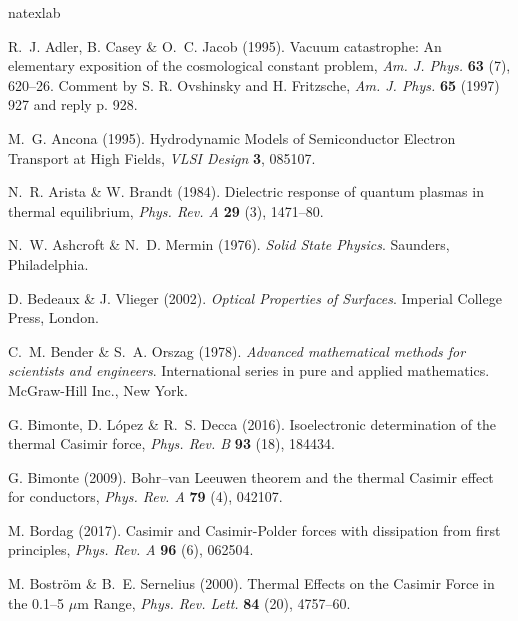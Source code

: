 \documentclass[11pt, oneside]{article}   	%
\begin{document}
\begin{thebibliography}{58}
\expandafter\ifx\csname natexlab\endcsname\relax\def\natexlab#1{#1}\fi

R.~J. Adler, B. Casey \& O.~C. Jacob (1995).
\newblock Vacuum catastrophe: An elementary exposition of the cosmological
  constant problem, \emph{Am. J. Phys.} {\bf 63} (7), 620--26.
\newblock Comment by S. R. Ovshinsky and H. Fritzsche, \emph{Am. J. Phys.} {\bf
  65} (1997) 927 and reply p. 928.

M.~G. Ancona (1995).
\newblock Hydrodynamic Models of Semiconductor Electron Transport at High
  Fields, \emph{VLSI Design} {\bf 3}, 085107.

N.~R. Arista \& W. Brandt (1984).
\newblock Dielectric response of quantum plasmas in thermal equilibrium,
  \emph{Phys. Rev. A} {\bf 29} (3), 1471--80.

N.~W. Ashcroft \& N.~D. Mermin (1976).
\newblock \emph{Solid State Physics}.
\newblock Saunders, Philadelphia.

D. Bedeaux \& J. Vlieger (2002).
\newblock \emph{Optical Properties of Surfaces}.
\newblock Imperial College Press, London.

C.~M. Bender \& S.~A. Orszag (1978).
\newblock \emph{Advanced mathematical methods for scientists and engineers}.
\newblock International series in pure and applied mathematics. McGraw-Hill
  Inc., New York.

G. Bimonte, D. L{\'o}pez \& R.~S. Decca (2016).
\newblock Isoelectronic determination of the thermal Casimir force, \emph{Phys.
  Rev. B} {\bf 93} (18), 184434.

G. Bimonte (2009).
\newblock Bohr--van Leeuwen theorem and the thermal Casimir effect for
  conductors, \emph{Phys. Rev. A} {\bf 79} (4), 042107.

M. Bordag (2017).
\newblock Casimir and {C}asimir-{P}older forces with dissipation from first
  principles, \emph{Phys. Rev. A} {\bf 96} (6), 062504.

M. Bostr{\"o}m \& B.~E. Sernelius (2000).
\newblock Thermal Effects on the Casimir Force in the 0.1--5 $\mu$m Range,
  \emph{Phys. Rev. Lett.} {\bf 84} (20), 4757--60.


\end{thebibliography}
\end{document}

